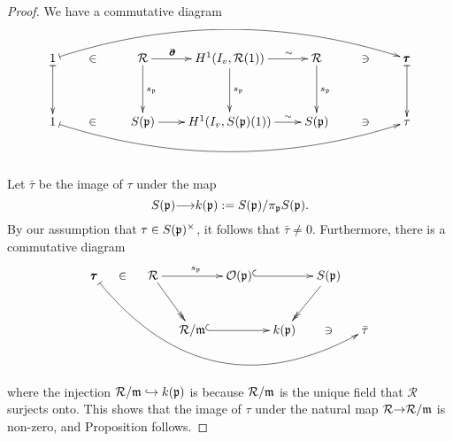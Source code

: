 \documentclass[12pt]{amsart}
\numberwithin{equation}{section}
\begin{document}
 \begin{proof}
 We have a commutative diagram\\\\
 $$ \xymatrix@C=.29in@R=.2in{1 \ar @{|->}[dd] \ar @/^2pc/@{|->}[rrrrrr]&**[l]\in&{\mathcal{R}} \ar[dd]^{s_\frak{p}}\ar[r]^(.34){\pmb{\partial}}& H^1(I_v,{\mathcal{R}}(1)) \ar[dd]^{s_\frak{p}} \ar[r]^(.68){\sim}&{\mathcal{R}}\ar[dd]^{s_\frak{p}}&**[l] \ni&\pmb{\tau} \ar @{|->}[dd]\\
&&&&&&\\
1\ar @/_2pc/@{|->}[rrrrrr]&**[l]\in&S(\frak{p})\ar[r] & H^1(I_v,S(\frak{p})(1))\ar[r]^(.67){\sim}&S(\frak{p}) &**[l] \ni &\tau
 }$$
 \\\\
Let $\bar{\tau}$ be the image of $\tau$ under the map
 $$S(\frak{p}) {\longrightarrow} k(\frak{p}):=S(\frak{p})/\pi_\frak{p}S(\frak{p}).$$
 By our assumption that $\tau \in S(\frak{p})^\times$, it follows that $\bar{\tau} \neq 0$.  Furthermore, there is a commutative diagram
 $$\xymatrix@C=.15in@R=.15in{\pmb{\tau}\ar @/_4pc/@{|->}[ddrrrrrrr] &\in&{\mathcal{R}}\ar@{-{>>}}[rdd]\ar[rr]^{s_\frak{p}}&&{\mathcal{O}}(\frak{p})\ar@{^{(}->}[rr]&&S(\frak{p})\ar@{-{>>}}[ddl]\\
&&&&&&&\\
&&&{\mathcal{R}}/\frak{m}\ar@{^{(}->}[rr]&&k(\frak{p})&\ni&\bar{\tau}
} $$\\\\
where the injection ${\mathcal{R}}/\frak{m} \hookrightarrow k(\frak{p})$ is because ${\mathcal{R}}/\frak{m}$ is the unique field that ${\mathcal{R}}$ surjects onto. This shows that the image of $\tau$ under the natural map ${\mathcal{R}}{\rightarrow}{\mathcal{R}}/\frak{m}$ is non-zero, and Proposition follows.
 \end{proof}
 
 
 
 
 
 
 
 
 

 
\end{document}
